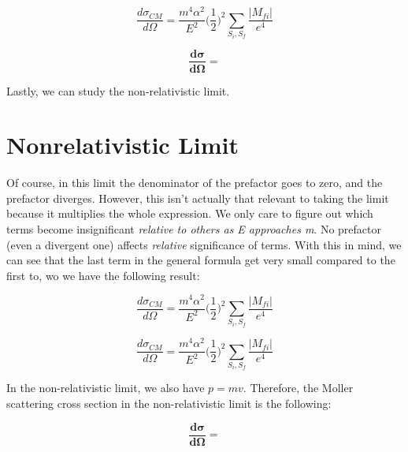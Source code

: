 \documentclass[a4]{article}
\begin{document}
    \begin{equation}
        \frac{d \sigma_{CM}}{d \Omega} = \frac{m^4 \alpha^2}{E^2} \bigg( \frac{1}{2} \bigg)^2 \sum_{S_i, S_f} \frac{|M_{fi}|}{e^4}
    \end{equation}

    \begin{framed}
        \begin{equation}
            \mathbf{\frac{d \sigma}{d \Omega} = }
        \end{equation}
    \end{framed}

    Lastly, we can study the non-relativistic limit.
        
    \section*{Nonrelativistic Limit}

    Of course, in this limit the denominator of the prefactor goes to zero, and the prefactor diverges. However, this isn't actually that relevant to taking the limit because it multiplies the whole expression. We only care to figure out which
    terms become insignificant \textit{relative to others as E approaches m}. No prefactor (even a divergent one) affects \textit{relative} significance of terms. With this in mind, we can see that the last term in the general formula get very
    small compared to the first to, wo we have the following result:

    \begin{equation}
        \frac{d \sigma_{CM}}{d \Omega} = \frac{m^4 \alpha^2}{E^2} \bigg( \frac{1}{2} \bigg)^2 \sum_{S_i, S_f} \frac{|M_{fi}|}{e^4}
    \end{equation}

    \begin{equation}
        \frac{d \sigma_{CM}}{d \Omega} = \frac{m^4 \alpha^2}{E^2} \bigg( \frac{1}{2} \bigg)^2 \sum_{S_i, S_f} \frac{|M_{fi}|}{e^4}
    \end{equation}

    In the non-relativistic limit, we also have $p = mv$. Therefore, the Moller scattering cross section in the non-relativistic limit is the following:

    \begin{framed}
        \begin{equation}
            \mathbf{\frac{d \sigma}{d \Omega} = }
        \end{equation}
    \end{framed}
\end{document}
